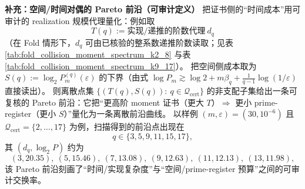 \begin{remark}
\medskip\noindent\textbf{补充：空间/时间对偶的 Pareto 前沿（可审计定义）}
把证书侧的“时间成本”用可审计的 realization 规模代理量化：例如取
\[
T(q):=\text{实现/递推的阶数代理}\ d_q
\]
（在 Fold 情形下，\(d_q\) 可由已核验的整系数递推阶数读取；见表 \ref{tab:fold_collision_moment_spectrum_k2_8} 与表 \ref{tab:fold_collision_moment_spectrum_k9_17}）。
把空间侧成本取为
\(
S(q):=\log_2 P_m^{(q)}(\varepsilon)
\)
的下界（由式 \(\log P_m\gtrsim \log2+m\beta_q+\frac{1}{q-1}\log(1/\varepsilon)\) 直接读出）。
则离散点集
\(
\{(T(q),S(q)):\ q\in\mathcal{Q}_{\mathrm{cert}}\}
\)
的非支配子集给出一条可复核的 Pareto 前沿：它把“更高阶 moment 证书（更大 \(T\)）\(\Rightarrow\) 更小 prime-register（更小 \(S\)）”量化为一条离散前沿曲线。
以样例 \((m,\varepsilon)=(30,10^{-6})\) 且 \(\mathcal{Q}_{\mathrm{cert}}=\{2,\dots,17\}\) 为例，扫描得到的前沿点出现在
\[
q\in\{3,5,9,11,15,17\},
\]
其 \((d_q,\log_2 P)\) 约为
\[
(3,20.35),\ (5,15.46),\ (7,13.08),\ (9,12.63),\ (11,12.13),\ (13,11.98),
\]
该 Pareto 前沿刻画了“时间/实现复杂度”与“空间/prime-register 预算”之间的可审计交换率。
\end{remark}

